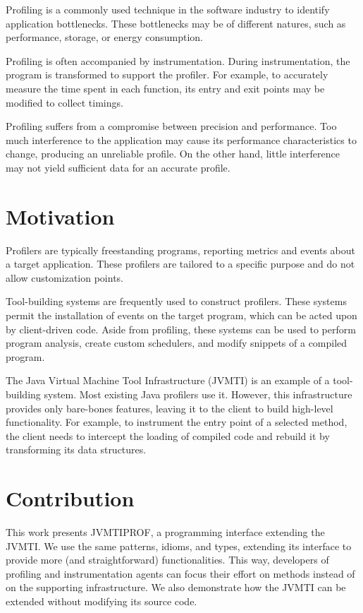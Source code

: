 \label{cap:introduction}

Profiling is a commonly used technique in the software industry to identify application bottlenecks. These bottlenecks may be of different natures, such as performance, storage, or energy consumption.

Profiling is often accompanied by instrumentation. During instrumentation, the program is transformed to support the profiler. For example, to accurately measure the time spent in each function, its entry and exit points may be modified to collect timings.

Profiling suffers from a compromise between precision and performance. Too much interference to the application may cause its performance characteristics to change, producing an unreliable profile. On the other hand, little interference may not yield sufficient data for an accurate profile.

\section{Motivation}

Profilers are typically freestanding programs, reporting metrics and events about a target application. These profilers are tailored to a specific purpose and do not allow customization points.

Tool-building systems are frequently used to construct profilers. These systems permit the installation of events on the target program, which can be acted upon by client-driven code. Aside from profiling, these systems can be used to perform program analysis, create custom schedulers, and modify snippets of a compiled program.

The Java Virtual Machine Tool Infrastructure (JVMTI) is an example of a tool-building system. Most existing Java profilers use it. However, this infrastructure provides only bare-bones features, leaving it to the client to build high-level functionality. For example, to instrument the entry point of a selected method, the client needs to intercept the loading of compiled code and rebuild it by transforming its data structures.

\section{Contribution}

This work presents JVMTIPROF, a programming interface extending the JVMTI. We use the same patterns, idioms, and types, extending its interface to provide more (and straightforward) functionalities. This way, developers of profiling and instrumentation agents can focus their effort on methods instead of on the supporting infrastructure. We also demonstrate how the JVMTI can be extended without modifying its source code.

